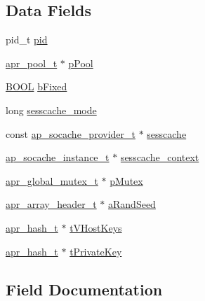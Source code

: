 \subsection*{Data Fields}
\begin{DoxyCompactItemize}
\item 
pid\+\_\+t \hyperlink{structSSLModConfigRec_a502680db48a6c7c3c15f880873fae223}{pid}
\item 
\hyperlink{structapr__pool__t}{apr\+\_\+pool\+\_\+t} $\ast$ \hyperlink{structSSLModConfigRec_a7e9cfc0dd676d1133dd99f2d5d6ab8b6}{p\+Pool}
\item 
\hyperlink{pcre__internal_8h_a050c65e107f0c828f856a231f4b4e788}{B\+O\+OL} \hyperlink{structSSLModConfigRec_aa6c6bc6c03979277ca0f25c6de4bea93}{b\+Fixed}
\item 
long \hyperlink{structSSLModConfigRec_ad0afa08beb86bbc8d471ecbb3d55ce92}{sesscache\+\_\+mode}
\item 
const \hyperlink{structap__socache__provider__t}{ap\+\_\+socache\+\_\+provider\+\_\+t} $\ast$ \hyperlink{structSSLModConfigRec_adb8e8600966e26396f91b022e07a492c}{sesscache}
\item 
\hyperlink{structap__socache__instance__t}{ap\+\_\+socache\+\_\+instance\+\_\+t} $\ast$ \hyperlink{structSSLModConfigRec_a7e21a98b4cf1958c6eb48294bc2045f9}{sesscache\+\_\+context}
\item 
\hyperlink{structapr__global__mutex__t}{apr\+\_\+global\+\_\+mutex\+\_\+t} $\ast$ \hyperlink{structSSLModConfigRec_a98b0aeb6c70127d79a69b22d5682efb2}{p\+Mutex}
\item 
\hyperlink{structapr__array__header__t}{apr\+\_\+array\+\_\+header\+\_\+t} $\ast$ \hyperlink{structSSLModConfigRec_a1518ea32bdea0c365a2ddc858ff3032f}{a\+Rand\+Seed}
\item 
\hyperlink{structapr__hash__t}{apr\+\_\+hash\+\_\+t} $\ast$ \hyperlink{structSSLModConfigRec_a9f994a465542b8d4a81381426b30069f}{t\+V\+Host\+Keys}
\item 
\hyperlink{structapr__hash__t}{apr\+\_\+hash\+\_\+t} $\ast$ \hyperlink{structSSLModConfigRec_a6a0d1bba0a5cc5a5a9efbf59387313eb}{t\+Private\+Key}
\end{DoxyCompactItemize}


\subsection{Field Documentation}
